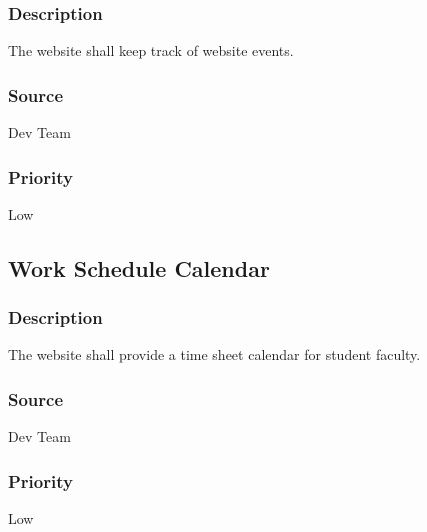 \subsubsection{Description}
The website shall keep track of website events.
\subsubsection{Source}
Dev Team
\subsubsection{Priority}
Low

\subsection{Work Schedule Calendar}
\subsubsection{Description}
The website shall provide a time sheet calendar for student faculty.
\subsubsection{Source}
Dev Team
\subsubsection{Priority}
Low
